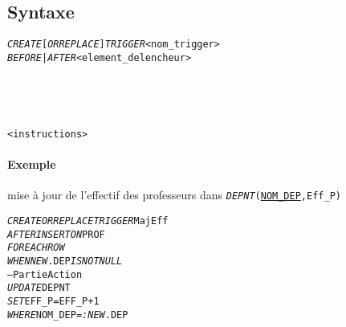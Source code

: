 \documentclass[10pt]{article}
\begin{document}
            \subsection{Syntaxe}
                \begin{alltt}
                    \begin{tabbing}
                        \emph{CREATE} [\emph{OR REPLACE}] \emph{TRIGGER} <nom_trigger>\\
                        \emph{BEFORE | AFTER} <element_delencheur> \\
                        [\emph{FOR EACH ROW}]\\
                        [\emph{WHEN} <condition>]\\
                        [\emph{DECLARE} ...]\\
                        [\emph{BEGIN}]\\
                            <instructions>\\
                        [\emph{END};]
                    \end{tabbing}
                \end{alltt}

                \paragraph{Exemple} mise à jour de l'effectif des professeurs dans \emph{\texttt{DEPNT}}\texttt{(}\underline{\texttt{NOM\_DEP}}\texttt{,Eff\_P)}
                \begin{alltt}
                    \begin{tabbing}
                        \emph{CREATE OR REPLACE TRIGGER} MajEff\\
                        \emph{AFTER INSERT ON} PROF\\
                        \emph{FOR EACH ROW}\\
                        \emph{WHEN NEW}.DEP \emph{IS NOT NULL}\\
                        -- Partie Action\\
                        \emph{UPDATE} DEPNT\\
                        \emph{SET} EFF_P=EFF_P+1\\
                        \emph{WHERE} NOM_DEP=\emph{:NEW}.DEP
                    \end{tabbing}
                \end{alltt}
\end{document}
